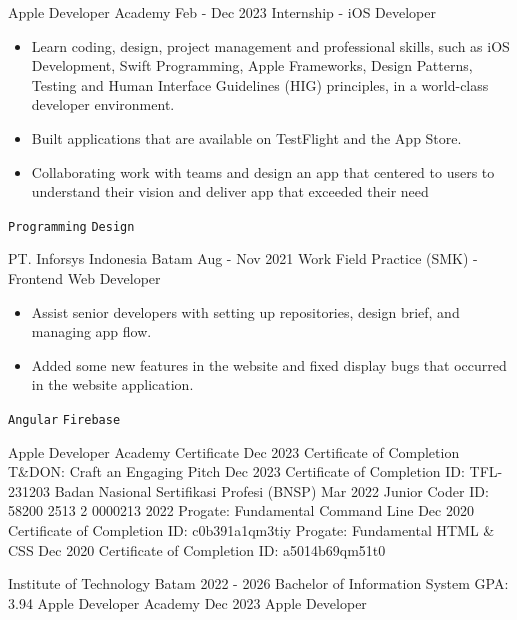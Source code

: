\documentclass[9pt]{developercv}
\begin{document}
\begin{minipage}[t]{0.465\textwidth}
\begin{entrylist}
	\entry
        {Apple Developer Academy}
		{Feb - Dec 2023}
		{Internship - iOS Developer}
		{\vspace{1pt}
        \begin{itemize}[noitemsep,topsep=0pt,parsep=0pt,partopsep=0pt, leftmargin=8pt]
            \item Learn coding, design, project management and professional skills, such as iOS Development, Swift Programming, Apple Frameworks, Design Patterns, Testing and Human Interface Guidelines (HIG) principles, in a world-class developer environment.
            \item Built applications that are available on TestFlight and the App Store.
            \item Collaborating work with teams and design an app that centered to users to understand their vision and deliver app that exceeded their need
        \end{itemize} 
        \texttt{Programming} \slashsep \texttt{Design}}
        
	\entry
		{PT. Inforsys Indonesia Batam}
		{Aug - Nov 2021}
		{Work Field Practice (SMK) - Frontend Web Developer}
		{\vspace{1pt}
        \begin{itemize}[noitemsep,topsep=0pt,parsep=0pt,partopsep=0pt, leftmargin=8pt]
            \item Assist senior developers with setting up repositories, design brief, and managing app flow.
            \item Added some new features in the website and fixed display bugs that occurred in the website application.
        \end{itemize} 
        \texttt{Angular} \slashsep \texttt{Firebase}}
\end{entrylist}
\begin{entrylist}
    \entry
		{Apple Developer Academy Certificate}
		{Dec 2023}
		{Certificate of Completion}
		{}
    \entry
		{T\&DON: Craft an Engaging Pitch}
		{Dec 2023}
		{Certificate of Completion}
		{ID: TFL-231203}
    \entry
		{Badan Nasional Sertifikasi Profesi (BNSP)}
		{Mar 2022}
		{Junior Coder}
		{ID: 58200 2513 2 0000213 2022}
    \entry
		{Progate: Fundamental Command Line}
		{Dec 2020}
		{Certificate of Completion}
		{ID: c0b391a1qm3tiy}
    \entry
		{Progate: Fundamental HTML \& CSS}
		{Dec 2020}
		{Certificate of Completion}
		{ID: a5014b69qm51t0}
\end{entrylist}

\begin{entrylist}
    \entry
		{Institute of Technology Batam}
		{2022 - 2026}
		{Bachelor of Information System}
		{GPA: 3.94}
    \entry
		{Apple Developer Academy}
		{Dec 2023}
		{Apple Developer}
		{}
\end{entrylist}
\end{minipage}
\end{document}
